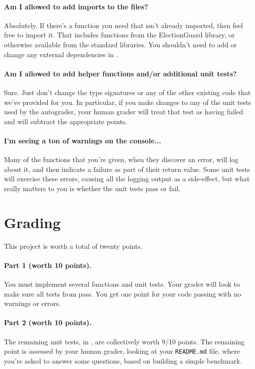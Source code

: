 \paragraph{Am I allowed to add imports to the files?} Absolutely. If
there's a function you need that isn't already imported, then feel
free to import it. That includes functions from the ElectionGuard
library, or otherwise available from the standard
 libraries.
You shouldn't need to add or change any external dependencies in
.

\paragraph{Am I allowed to add helper functions and/or additional unit
  tests?} Sure. Just don't change the type signatures or any of the
other existing code that we've provided for you. In particular,
if you make changes to any of the unit tests used by the autograder,
your human grader will treat that test as having failed and will
subtract the appropriate points.

\paragraph{I'm seeing a ton of warnings on the console...} Many of the
functions that you're given, when they discover an error, will
log about it, and then indicate a failure as part of their return
value. Some unit tests will exercise these errors, causing all
the logging output as a side-effect, but what really matters to
you is whether the unit tests pass or fail.

\section{Grading}

This project is worth a total of twenty points.

\paragraph{Part 1 (worth 10 points).} You must implement several functions and unit
tests. Your grader will look to make sure all tests from
 pass. You get one point for
your code passing 
with no warnings or errors.

\paragraph{Part 2 (worth 10 points).} The remaining unit tests, in
, are collectively worth
9/10 points. The remaining point is assessed by your human
grader, looking at your {\tt README.md} file, where you're
asked to answer some questions, based on building a simple benchmark.

